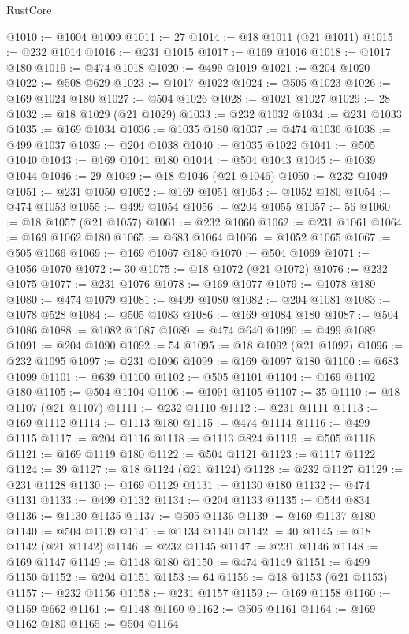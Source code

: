 \begin{lexlean}{RustCore}
\begin{coremodule}
@1010 := @1004 @1009
@1011 := 27
@1014 := @18 @1011 (@21 @1011)
@1015 := @232 @1014
@1016 := @231 @1015
@1017 := @169 @1016
@1018 := @1017 @180
@1019 := @474 @1018
@1020 := @499 @1019
@1021 := @204 @1020
@1022 := @508 @629
@1023 := @1017 @1022
@1024 := @505 @1023
@1026 := @169 @1024 @180
@1027 := @504 @1026
@1028 := @1021 @1027
@1029 := 28
@1032 := @18 @1029 (@21 @1029)
@1033 := @232 @1032
@1034 := @231 @1033
@1035 := @169 @1034
@1036 := @1035 @180
@1037 := @474 @1036
@1038 := @499 @1037
@1039 := @204 @1038
@1040 := @1035 @1022
@1041 := @505 @1040
@1043 := @169 @1041 @180
@1044 := @504 @1043
@1045 := @1039 @1044
@1046 := 29
@1049 := @18 @1046 (@21 @1046)
@1050 := @232 @1049
@1051 := @231 @1050
@1052 := @169 @1051
@1053 := @1052 @180
@1054 := @474 @1053
@1055 := @499 @1054
@1056 := @204 @1055
@1057 := 56
@1060 := @18 @1057 (@21 @1057)
@1061 := @232 @1060
@1062 := @231 @1061
@1064 := @169 @1062 @180
@1065 := @683 @1064
@1066 := @1052 @1065
@1067 := @505 @1066
@1069 := @169 @1067 @180
@1070 := @504 @1069
@1071 := @1056 @1070
@1072 := 30
@1075 := @18 @1072 (@21 @1072)
@1076 := @232 @1075
@1077 := @231 @1076
@1078 := @169 @1077
@1079 := @1078 @180
@1080 := @474 @1079
@1081 := @499 @1080
@1082 := @204 @1081
@1083 := @1078 @528
@1084 := @505 @1083
@1086 := @169 @1084 @180
@1087 := @504 @1086
@1088 := @1082 @1087
@1089 := @474 @640
@1090 := @499 @1089
@1091 := @204 @1090
@1092 := 54
@1095 := @18 @1092 (@21 @1092)
@1096 := @232 @1095
@1097 := @231 @1096
@1099 := @169 @1097 @180
@1100 := @683 @1099
@1101 := @639 @1100
@1102 := @505 @1101
@1104 := @169 @1102 @180
@1105 := @504 @1104
@1106 := @1091 @1105
@1107 := 35
@1110 := @18 @1107 (@21 @1107)
@1111 := @232 @1110
@1112 := @231 @1111
@1113 := @169 @1112
@1114 := @1113 @180
@1115 := @474 @1114
@1116 := @499 @1115
@1117 := @204 @1116
@1118 := @1113 @824
@1119 := @505 @1118
@1121 := @169 @1119 @180
@1122 := @504 @1121
@1123 := @1117 @1122
@1124 := 39
@1127 := @18 @1124 (@21 @1124)
@1128 := @232 @1127
@1129 := @231 @1128
@1130 := @169 @1129
@1131 := @1130 @180
@1132 := @474 @1131
@1133 := @499 @1132
@1134 := @204 @1133
@1135 := @544 @834
@1136 := @1130 @1135
@1137 := @505 @1136
@1139 := @169 @1137 @180
@1140 := @504 @1139
@1141 := @1134 @1140
@1142 := 40
@1145 := @18 @1142 (@21 @1142)
@1146 := @232 @1145
@1147 := @231 @1146
@1148 := @169 @1147
@1149 := @1148 @180
@1150 := @474 @1149
@1151 := @499 @1150
@1152 := @204 @1151
@1153 := 64
@1156 := @18 @1153 (@21 @1153)
@1157 := @232 @1156
@1158 := @231 @1157
@1159 := @169 @1158
@1160 := @1159 @662
@1161 := @1148 @1160
@1162 := @505 @1161
@1164 := @169 @1162 @180
@1165 := @504 @1164

\end{coremodule}
\end{lexlean}
